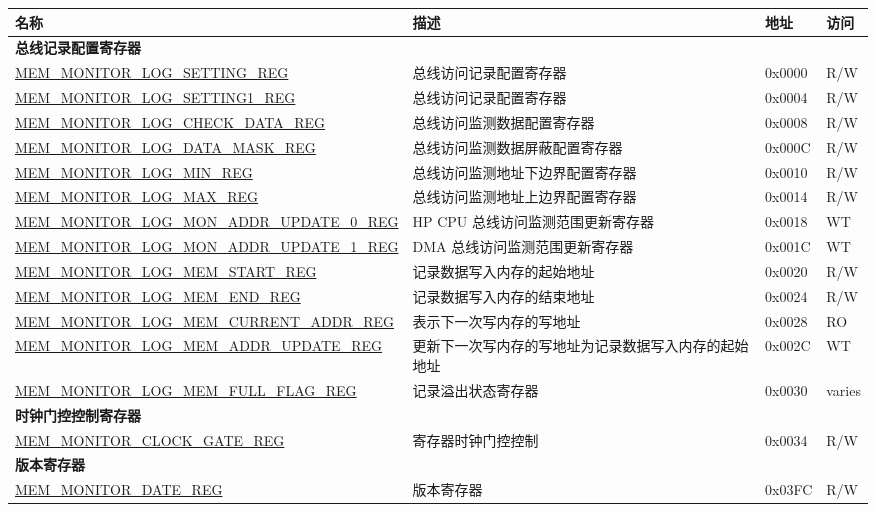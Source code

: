 
\begin{longtable}{ | l| m{10cm} | l | l | }
\hline\rowcolor{lightgray}
{\bfseries 名称} & {\bfseries 描述} &  {\bfseries 地址} & {\bfseries 访问} \\ \hline
\endhead
\multicolumn{4}{|l|}{\textbf{总线记录配置寄存器}} \\ \hline
\hyperref[regdesc:MEMMONITORLOGSETTINGREG]{MEM\_MONITOR\_LOG\_SETTING\_REG} & 总线访问记录配置寄存器 & 0x0000 & R/W \\ \hline
\hyperref[regdesc:MEMMONITORLOGSETTING1REG]{MEM\_MONITOR\_LOG\_SETTING1\_REG} & 总线访问记录配置寄存器 & 0x0004 & R/W \\ \hline
\hyperref[regdesc:MEMMONITORLOGCHECKDATAREG]{MEM\_MONITOR\_LOG\_CHECK\_DATA\_REG} & 总线访问监测数据配置寄存器 & 0x0008 & R/W \\ \hline
\hyperref[regdesc:MEMMONITORLOGDATAMASKREG]{MEM\_MONITOR\_LOG\_DATA\_MASK\_REG} & 总线访问监测数据屏蔽配置寄存器 & 0x000C & R/W \\ \hline
\hyperref[regdesc:MEMMONITORLOGMINREG]{MEM\_MONITOR\_LOG\_MIN\_REG} & 总线访问监测地址下边界配置寄存器 & 0x0010 & R/W \\ \hline
\hyperref[regdesc:MEMMONITORLOGMAXREG]{MEM\_MONITOR\_LOG\_MAX\_REG} & 总线访问监测地址上边界配置寄存器 & 0x0014 & R/W \\ \hline
\hyperref[regdesc:MEMMONITORLOGMONADDRUPDATE0REG]{MEM\_MONITOR\_LOG\_MON\_ADDR\_UPDATE\_0\_REG} & HP CPU 总线访问监测范围更新寄存器 & 0x0018 & WT \\ \hline
\hyperref[regdesc:MEMMONITORLOGMONADDRUPDATE1REG]{MEM\_MONITOR\_LOG\_MON\_ADDR\_UPDATE\_1\_REG} & DMA 总线访问监测范围更新寄存器 & 0x001C & WT \\ \hline
\hyperref[regdesc:MEMMONITORLOGMEMSTARTREG]{MEM\_MONITOR\_LOG\_MEM\_START\_REG} & 记录数据写入内存的起始地址 & 0x0020 & R/W \\ \hline
\hyperref[regdesc:MEMMONITORLOGMEMENDREG]{MEM\_MONITOR\_LOG\_MEM\_END\_REG} & 记录数据写入内存的结束地址 & 0x0024 & R/W \\ \hline
\hyperref[regdesc:MEMMONITORLOGMEMCURRENTADDRREG]{MEM\_MONITOR\_LOG\_MEM\_CURRENT\_ADDR\_REG} & 表示下一次写内存的写地址 & 0x0028 & RO \\ \hline
\hyperref[regdesc:MEMMONITORLOGMEMADDRUPDATEREG]{MEM\_MONITOR\_LOG\_MEM\_ADDR\_UPDATE\_REG} & 更新下一次写内存的写地址为记录数据写入内存的起始地址 & 0x002C & WT \\ \hline
\hyperref[regdesc:MEMMONITORLOGMEMFULLFLAGREG]{MEM\_MONITOR\_LOG\_MEM\_FULL\_FLAG\_REG} & 记录溢出状态寄存器 & 0x0030 & varies \\ \hline
\multicolumn{4}{|l|}{\textbf{时钟门控控制寄存器}} \\ \hline
\hyperref[regdesc:MEMMONITORCLOCKGATEREG]{MEM\_MONITOR\_CLOCK\_GATE\_REG} & 寄存器时钟门控控制 & 0x0034 & R/W \\ \hline
\multicolumn{4}{|l|}{\textbf{版本寄存器}} \\ \hline
\hyperref[regdesc:MEMMONITORDATEREG]{MEM\_MONITOR\_DATE\_REG} & 版本寄存器 & 0x03FC & R/W \\ \hline
\end{longtable}

